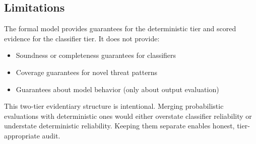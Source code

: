 \subsection{Limitations}
\label{sec:formal-model-A-2-7}


The formal model provides guarantees for the deterministic tier and scored evidence for the classifier tier. It does not provide:

\begin{itemize}
  \item Soundness or completeness guarantees for classifiers
  \item Coverage guarantees for novel threat patterns
  \item Guarantees about model behavior (only about output evaluation)
\end{itemize}


This two-tier evidentiary structure is intentional. Merging probabilistic evaluations with deterministic ones would either overstate classifier reliability or understate deterministic reliability. Keeping them separate enables honest, tier-appropriate audit.



